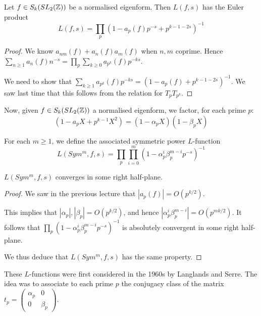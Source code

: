 \documentclass[10pt,a4paper]{article}
\begin{document}
\begin{theorem}
  Let $f \in S_k(SL_2(\mathbb{Z}))$ be a normalised eigenform. Then $L(f,s)$ has the Euler product \[L(f,s) = \prod_p (1-a_p(f)p^{-s} + p^{k-1-2s})^{-1}\]
\end{theorem}
\begin{proof}
  We know $a_{nm}(f) +a_n(f)a_m(f)$ when $n,m$ coprime. Hence $\sum_{n\geq 1} a_n(f) n^{-s} = \prod_p \sum_{k \geq 0} a_{p^k}(f)p^{-ks}$.

  We need to show that $\sum_{k \geq 1} a_{p^k}(f) p^{-ks} = (1-a_p(f)+p^{k-1-2s})^{-1}$. We saw last time that this follows from the relation for $T_p T_{p^k}$.
\end{proof}
Now, given $f \in S_k(SL_2(\mathbb{Z}))$ a normalised eigenform, we factor, for each prime $p$:
\[(1-a_pX + p^{k-1}X^2) = (1-\alpha_p X)(1-\beta_p X)\]
\begin{definition}
  For each $m \geq 1$, we define the associated symmetric power $L$-function
  \[L(Sym^m, f,s) =  \prod_p \prod_{i=0}^m (1-\alpha_p^i \beta_p^{m-i} p^{-s})^{-1}\]
\end{definition}
\begin{lemma}
  $L(Sym^m,f,s)$ converges in some right half-plane.
\end{lemma}
\begin{proof}
  We saw in the previous lecture that $|a_p(f)| = O(p^{k/2})$.

  This implies that $|\alpha_p|, |\beta_p| = O(p^{k/2})$, and hence $|\alpha_p^i \beta_p^{m-i}| = O(p^{mk/2})$. It follows that $\prod_p (1-\alpha_p^i\beta_p^{m-i}p^{-s})^{-1}$ is absolutely convergent in some right half-plane.

  We thus deduce that $L(Sym^m, f,s)$ has the same property.
\end{proof}

These $L$-functions were first considered in the 1960s by Langlands and Serre. The idea was to associate to each prime $p$ the conjugacy class of the matrix $t_p = \begin{pmatrix} \alpha_p & 0 \\ 0 & \beta_p \end{pmatrix}$.
\end{document}
